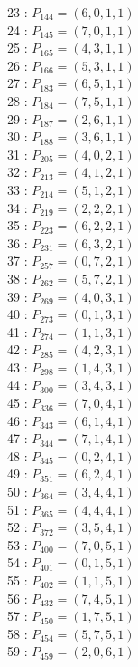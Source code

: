 \documentclass{article}
\begin{document}
{\begin{multicols}{3}
23 : $P_{144}=( 6, 0, 1, 1 )$\\
24 : $P_{145}=( 7, 0, 1, 1 )$\\
25 : $P_{165}=( 4, 3, 1, 1 )$\\
26 : $P_{166}=( 5, 3, 1, 1 )$\\
27 : $P_{183}=( 6, 5, 1, 1 )$\\
28 : $P_{184}=( 7, 5, 1, 1 )$\\
29 : $P_{187}=( 2, 6, 1, 1 )$\\
30 : $P_{188}=( 3, 6, 1, 1 )$\\
31 : $P_{205}=( 4, 0, 2, 1 )$\\
32 : $P_{213}=( 4, 1, 2, 1 )$\\
33 : $P_{214}=( 5, 1, 2, 1 )$\\
34 : $P_{219}=( 2, 2, 2, 1 )$\\
35 : $P_{223}=( 6, 2, 2, 1 )$\\
36 : $P_{231}=( 6, 3, 2, 1 )$\\
37 : $P_{257}=( 0, 7, 2, 1 )$\\
38 : $P_{262}=( 5, 7, 2, 1 )$\\
39 : $P_{269}=( 4, 0, 3, 1 )$\\
40 : $P_{273}=( 0, 1, 3, 1 )$\\
41 : $P_{274}=( 1, 1, 3, 1 )$\\
42 : $P_{285}=( 4, 2, 3, 1 )$\\
43 : $P_{298}=( 1, 4, 3, 1 )$\\
44 : $P_{300}=( 3, 4, 3, 1 )$\\
45 : $P_{336}=( 7, 0, 4, 1 )$\\
46 : $P_{343}=( 6, 1, 4, 1 )$\\
47 : $P_{344}=( 7, 1, 4, 1 )$\\
48 : $P_{345}=( 0, 2, 4, 1 )$\\
49 : $P_{351}=( 6, 2, 4, 1 )$\\
50 : $P_{364}=( 3, 4, 4, 1 )$\\
51 : $P_{365}=( 4, 4, 4, 1 )$\\
52 : $P_{372}=( 3, 5, 4, 1 )$\\
53 : $P_{400}=( 7, 0, 5, 1 )$\\
54 : $P_{401}=( 0, 1, 5, 1 )$\\
55 : $P_{402}=( 1, 1, 5, 1 )$\\
56 : $P_{432}=( 7, 4, 5, 1 )$\\
57 : $P_{450}=( 1, 7, 5, 1 )$\\
58 : $P_{454}=( 5, 7, 5, 1 )$\\
59 : $P_{459}=( 2, 0, 6, 1 )$\\

\end{multicols}}
\end{document}
